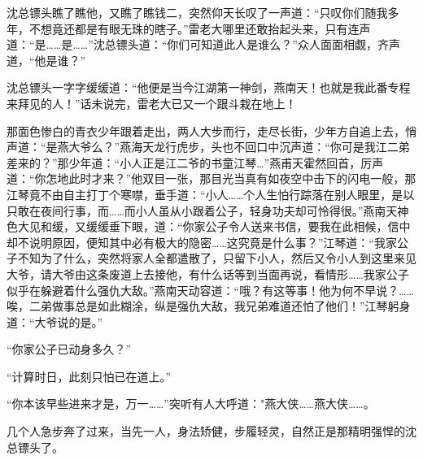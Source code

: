 \documentclass[12pt,oneside]{book}
\begin{document}
沈总镖头瞧了瞧他，又瞧了瞧钱二，突然仰天长叹了一声道：``只叹你们随我多年，不想竟还都是有眼无珠的瞎子。''雷老大哪里还敢抬起头来，只有连声道：``是\ldots\ldots 是\ldots\ldots{}''沈总镖头道：``你们可知道此人是谁么？''众人面面相觑，齐声道，``他是谁？''

沈总镖头一字字缓缓道：``他便是当今江湖第一神剑，燕南天！也就是我此番专程来拜见的人！''话未说完，雷老大已又一个跟斗栽在地上！

那面色惨白的青衣少年跟着走出，两人大步而行，走尽长街，少年方自追上去，悄声道：``是燕大爷么？''燕海天龙行虎步，头也不回口中沉声道：``你可是我江二弟差来的？''那少年道：``小人正是江二爷的书童江琴\ldots{}''燕甫天霍然回首，厉声道：``你怎地此时才来？''他双目一张，那目光当真有如夜空中击下的闪电一般，那江琴竟不由自主打丁个寒噤，垂手道：``小人\ldots\ldots 个人生怕行踪落在别人眼里，是以只敢在夜间行事，而\ldots\ldots 而小人虽从小跟着公子，轻身功夫却可怜得很。''燕南天神色大见和缓，又缓缓垂下眼，道：``你家公子令人送来书信，要我在此相候，信中却不说明原因，便知其中必有极大的隐密\ldots\ldots 这究竟是什么事？''江琴道：``我家公子不知为了什么，突然将家人全都遣散了，只留下小人，然后又令小人到这里来见大爷，请大爷由这条废道上去接他，有什么话等到当面再说，看情形\ldots\ldots 我家公子似乎在躲避着什么强仇大敌。''燕南天动容道：``哦？有这等事！他为何不早说？\ldots\ldots 唉，二弟做事总是如此糊涂，纵是强仇大敌，我兄弟难道还怕了他们！''江琴躬身道：``大爷说的是。''

``你家公子已动身多久？''

``计算时日，此刻只怕已在道上。''

``你本该早些进来才是，万一\ldots\ldots{}''突听有人大呼道："燕大侠\ldots\ldots 燕大侠\ldots\ldots。

几个人急步奔了过来，当先一人，身法矫健，步履轻灵，自然正是那精明强悍的沈总镖头了。
\end{document}
